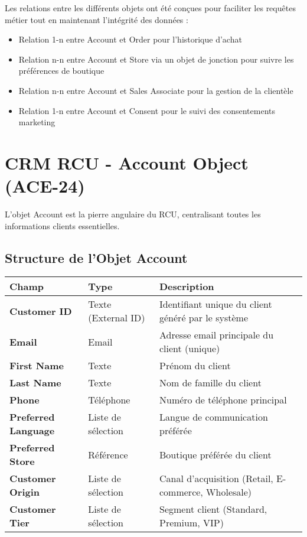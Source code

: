 Les relations entre les différents objets ont été conçues pour faciliter les requêtes métier tout en maintenant l'intégrité des données :

\begin{itemize}
    \item Relation 1-n entre Account et Order pour l'historique d'achat
    \item Relation n-n entre Account et Store via un objet de jonction pour suivre les préférences de boutique
    \item Relation n-n entre Account et Sales Associate pour la gestion de la clientèle
    \item Relation 1-n entre Account et Consent pour le suivi des consentements marketing
\end{itemize}

\section{CRM RCU - Account Object (ACE-24)}

L'objet Account est la pierre angulaire du RCU, centralisant toutes les informations clients essentielles.

\subsection{Structure de l'Objet Account}

\begin{center}
\begin{tabular}{|>{\bfseries}p{4cm}|p{4cm}|p{5.5cm}|}
\hline
\rowcolor{lightblue} Champ & Type & Description \\
\hline
Customer ID & Texte (External ID) & Identifiant unique du client généré par le système \\
\hline
Email & Email & Adresse email principale du client (unique) \\
\hline
First Name & Texte & Prénom du client \\
\hline
Last Name & Texte & Nom de famille du client \\
\hline
Phone & Téléphone & Numéro de téléphone principal \\
\hline
Preferred Language & Liste de sélection & Langue de communication préférée \\
\hline
Preferred Store & Référence & Boutique préférée du client \\
\hline
Customer Origin & Liste de sélection & Canal d'acquisition (Retail, E-commerce, Wholesale) \\
\hline
Customer Tier & Liste de sélection & Segment client (Standard, Premium, VIP) \\
\hline
\end{tabular}
\end{center}

